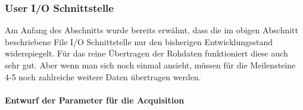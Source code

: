 
\subsubsection{User I/O Schnittstelle}
Am Anfang des Abschnitts wurde bereits erwähnt, dass die im obigen Abschnitt beschriebene File I/O Schnittstelle nur den bisherigen Entwicklungsstand widerspiegelt. Für das reine Übertragen der Rohdaten funktioniert diese auch sehr gut. Aber wenn man sich noch einmal  ansieht, müssen für die Meilensteine 4-5 noch zahlreiche weitere Daten übertragen werden. 

\paragraph{Entwurf der Parameter für die Acquisition}



